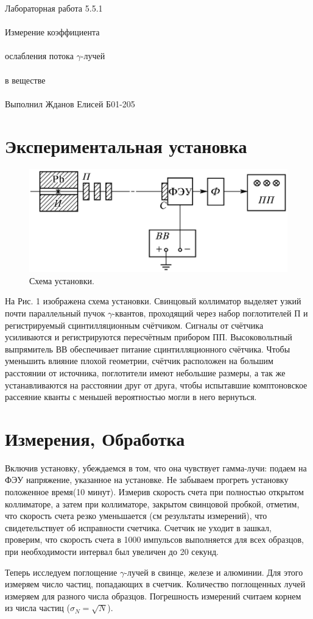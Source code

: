 \documentclass{astroedu-lab}
\begin{document}
\begin{problem}{\huge Лабораторная работа 5.5.1\\\\Измерение коэффициента\\\\ослабления потока $\gamma$-лучей\\\\в веществе\\\\Выполнил Жданов Елисей Б01-205}
\section{Экспериментальная установка}

\begin{figure}[h]
\includegraphics[scale=0.5]{1.png}
\centering
\caption{Схема установки.}
\end{figure}
На Рис. 1 изображена схема установки. Свинцовый коллиматор выделяет узкий почти параллельный пучок $\gamma$-квантов, проходящий через набор поглотителей П и регистрируемый сцинтилляционным счётчиком. Сигналы от счётчика усиливаются и регистрируются пересчётным прибором ПП. Высоковольтный выпрямитель ВВ обеспечивает питание сцинтилляционного счётчика. Чтобы уменьшить влияние плохой геометрии, счётчик расположен на большим расстоянии от источника, поглотители имеют небольшие размеры, а так же устанавливаются на расстоянии друг от друга, чтобы испытавшие комптоновское рассеяние кванты с меньшей вероятностью могли в него вернуться.

\section{Измерения, Обработка}

Включив установку, убеждаемся в том, что она чувствует гамма-лучи: подаем на ФЭУ напряжение, указанное на установке. Не забываем прогреть установку положенное время(10 минут). Измерив скорость счета при полностью открытом коллиматоре, а затем при коллиматоре, закрытом свинцовой пробкой, отметим, что скорость счета резко уменьшается (см результаты измерений), что свидетельствует об исправности счетчика. Счетчик не уходит в зашкал, проверим, что скорость счета в 1000 импульсов выполняется для всех образцов, при необходимости интервал был увеличен до 20 секунд.

Теперь исследуем поглощение $\gamma$-лучей в свинце, железе и алюминии. Для этого измеряем число частиц, попадающих в счетчик. Количество поглощенных лучей измеряем для разного числа образцов. Погрешность измерений считаем корнем из числа частиц ($\sigma_N = \sqrt{N}$).


\end{problem}
\end{document}
